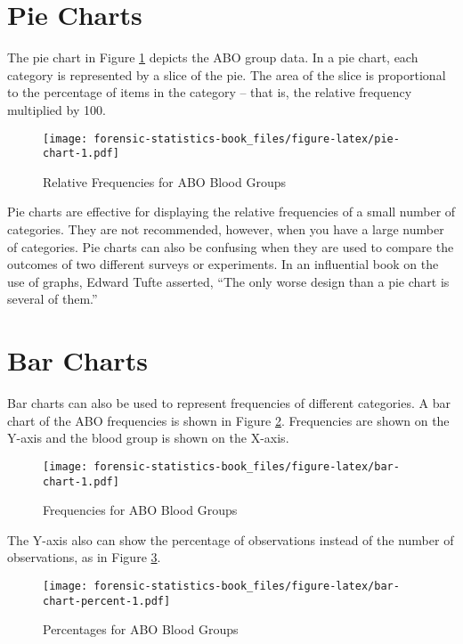 \documentclass[
]{book}
\begin{document}
\hypertarget{pie-charts}{%
\section{Pie Charts}\label{pie-charts}}

The pie chart in Figure \ref{fig:pie-chart} depicts the ABO group data. In a pie chart,
each category is represented by a slice of the pie. The area of the slice is
proportional to the percentage of items in the category -- that is, the
relative frequency multiplied by 100.

\begin{figure}
\centering
\texttt{[image: forensic-statistics-book\_files/figure-latex/pie-chart-1.pdf]}
\caption{\label{fig:pie-chart}Relative Frequencies for ABO Blood Groups}
\end{figure}

Pie charts are effective for displaying the relative frequencies of a small
number of categories. They are not recommended, however, when you have a large
number of categories. Pie charts can also be confusing when they are used to
compare the outcomes of two different surveys or experiments. In an influential
book on the use of graphs, Edward Tufte asserted, ``The only worse design than
a pie chart is several of them.''

\hypertarget{bar-charts}{%
\section{Bar Charts}\label{bar-charts}}

Bar charts can also be used to represent frequencies of different categories.
A bar chart of the ABO frequencies is shown in Figure \ref{fig:bar-chart}.
Frequencies are shown
on the Y-axis and the blood group is shown on the X-axis.

\begin{figure}
\centering
\texttt{[image: forensic-statistics-book\_files/figure-latex/bar-chart-1.pdf]}
\caption{\label{fig:bar-chart}Frequencies for ABO Blood Groups}
\end{figure}

The Y-axis also can show the percentage of observations
instead of the number of observations, as in Figure \ref{fig:bar-chart-percent}.

\begin{figure}
\centering
\texttt{[image: forensic-statistics-book\_files/figure-latex/bar-chart-percent-1.pdf]}
\caption{\label{fig:bar-chart-percent}Percentages for ABO Blood Groups}
\end{figure}
\end{document}
